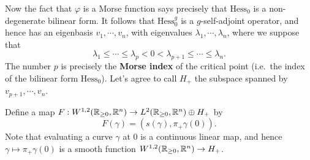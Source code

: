 \documentclass{amsart}
\begin{document}
Now the fact that $\varphi$ is a Morse function says precisely that $\text{Hess}_{0}$ is a non-degenerate bilinear form. It follows that $\text{Hess}^{g}_{0}$ is a $g$-self-adjoint operator, and hence has an eigenbasis $v_{1},\cdots,v_{n}$, with eigenvalues $\lambda_{1},\cdots,\lambda_{n}$, where we suppose that
\begin{equation*}
  \lambda_{1}\le \cdots\le \lambda_{p}<0<\lambda_{p+1}\le \cdots\le \lambda_{n}.
\end{equation*}
The number $p$ is precisely the \textbf{Morse index} of the critical point (i.e.\ the index of the bilinear form $\text{Hess}_{0}$). Let's agree to call $H_{+}$ the subspace spanned by $v_{p+1},\cdots,v_{n}$.

  Define a map $F:W^{1,2}(\mathbb{R}_{\ge 0},\mathbb{R}^{n})\to L^{2}(\mathbb{R}_{\ge 0},\mathbb{R}^{n})\oplus H_{+}$ by
  \begin{equation*}
    F(\gamma)=(s(\gamma),\pi_{+}\gamma(0)).
  \end{equation*}
  Note that evaluating a curve $\gamma$ at $0$ is a continuous linear map, and hence $\gamma\mapsto \pi_{+}\gamma(0)$ is a smooth function $W^{1,2}(\mathbb{R}_{\ge 0},\mathbb{R}^{n})\to H_{+}$.
\end{document}
